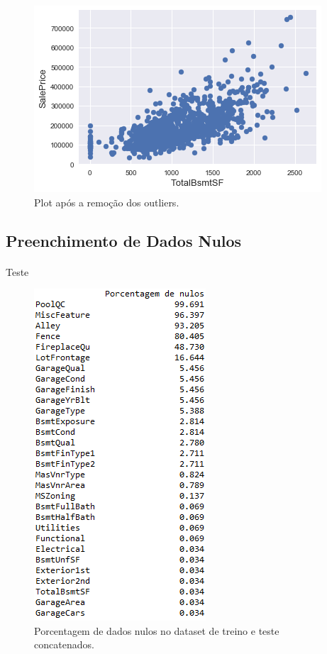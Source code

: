 \documentclass{article}
\begin{document}
			\begin{figure}[H]
				\centering
				\includegraphics[scale=0.8]{../img/totalbsmtsf_no_outliers}
				\caption{Plot após a remoção dos outliers.}
			\end{figure}
		
		\subsection{Preenchimento de Dados Nulos}
			\paragraph{}Teste
		
			\begin{figure}[H]
				\centering
				\includegraphics[scale=0.9]{../img/null_data}
				\caption{Porcentagem de dados nulos no dataset de treino e teste concatenados.}
			\end{figure}
		
\end{document}
